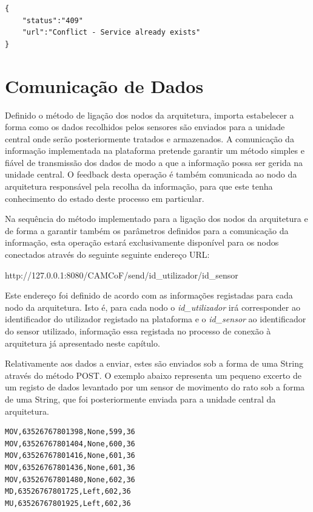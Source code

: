 \begin{lstlisting}[caption=Mensagem de conflito em JSON]
{
	"status":"409"
	"url":"Conflict - Service already exists"
}
\end{lstlisting}


\section{Comunicação de Dados}

Definido o método de ligação dos nodos da arquitetura, importa estabelecer a forma como os dados recolhidos pelos sensores são enviados para a unidade central onde serão posteriormente tratados e armazenados. A comunicação da informação implementada na plataforma pretende garantir um método simples e fiável de transmissão dos dados de modo a que a informação possa ser gerida na unidade central. O feedback desta operação é também comunicada ao nodo da arquitetura responsável pela recolha da informação, para que este tenha conhecimento do estado deste processo em particular.

Na sequência do método implementado para a ligação dos nodos da arquitetura e de forma a garantir também os parâmetros definidos para a comunicação da informação, esta operação estará exclusivamente disponível para os nodos conectados através do seguinte seguinte endereço URL:

http://127.0.0.1:8080/CAMCoF/send/id\_utilizador/id\_sensor

Este endereço foi definido de acordo com as informações registadas para cada nodo da arquitetura. Isto é, para cada nodo o \textit{id\_utilizador} irá corresponder ao identificador do utilizador registado na plataforma e o \textit{id\_sensor} ao identificador do sensor utilizado, informação essa registada no processo de conexão à arquitetura já apresentado neste capítulo.

Relativamente aos dados a enviar, estes são enviados sob a forma de uma String através do método POST. O exemplo abaixo representa um pequeno excerto de um registo de dados levantado por um sensor de movimento do rato sob a forma de uma String, que foi posteriormente enviada para a unidade central da arquitetura.\\
\begin{lstlisting}[caption=Excerto de dados levantado por sensor de movimento de rato]
MOV,63526767801398,None,599,36
MOV,63526767801404,None,600,36
MOV,63526767801416,None,601,36
MOV,63526767801436,None,601,36
MOV,63526767801480,None,602,36
MD,63526767801725,Left,602,36
MU,63526767801925,Left,602,36
\end{lstlisting}


